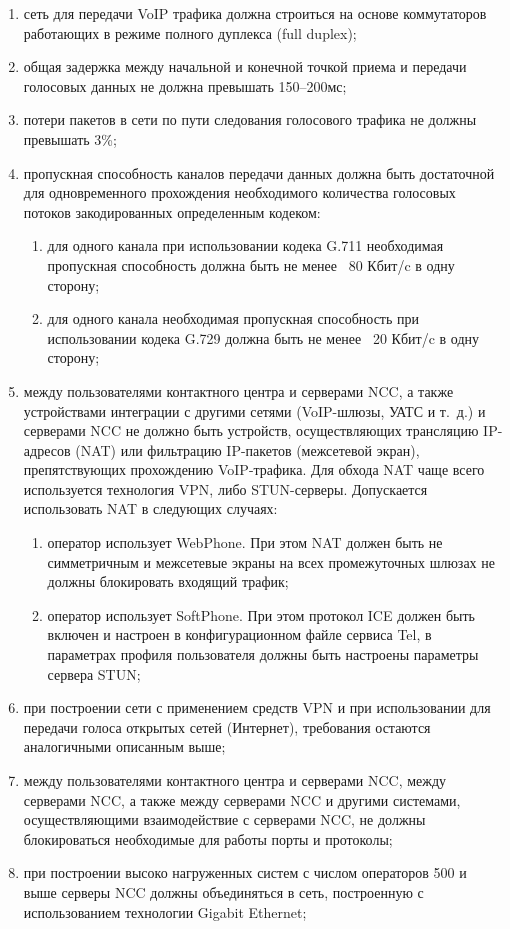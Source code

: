 \begin{enumerate}
    \item сеть для передачи VoIP трафика должна строиться на основе коммутаторов работающих в режиме полного дуплекса (full duplex);
    \item общая задержка между начальной и конечной точкой приема и передачи голосовых данных не должна превышать 150--200мс;
    \item потери пакетов в сети по пути следования голосового трафика не должны превышать 3\%;
    \item пропускная способность каналов передачи данных должна быть достаточной для одновременного прохождения необходимого количества голосовых потоков закодированных определенным кодеком:
    \begin{enumerate}
        \item для одного канала при использовании кодека G.711 необходимая пропускная способность должна быть не менее ~80 Кбит/c в одну сторону;
        \item для одного канала необходимая пропускная способность при использовании кодека G.729 должна быть не менее ~20 Кбит/c в одну сторону;
    \end{enumerate}
    \item между пользователями контактного центра и серверами NCC, а также устройствами интеграции с другими сетями (VoIP-шлюзы, УАТС и т.~д.) и серверами NCC не должно быть устройств, осуществляющих трансляцию IP-адресов (NAT) или фильтрацию IP-пакетов (межсетевой экран), препятствующих прохождению VoIP-трафика. Для обхода NAT чаще всего используется технология VPN, либо STUN-серверы. Допускается использовать NAT в следующих случаях:
    \begin{enumerate}
        \item оператор использует WebPhone. При этом NAT должен быть не симметричным и межсетевые экраны на всех промежуточных шлюзах не должны блокировать входящий трафик;
        \item оператор использует SoftPhone. При этом протокол ICE должен быть включен и настроен в конфигурационном файле сервиса Tel, в параметрах профиля пользователя должны быть настроены параметры сервера STUN;
    \end{enumerate}
    \item при построении сети с применением средств VPN и при использовании для передачи голоса открытых сетей (Интернет), требования остаются аналогичными описанным выше;
    \item между пользователями контактного центра и серверами NCC, между серверами NCC, а также между серверами NCC и другими системами, осуществляющими взаимодействие с серверами NCC, не должны блокироваться необходимые для работы порты и протоколы;
    \item при построении высоко нагруженных систем с числом операторов 500 и выше серверы NCC должны объединяться в сеть, построенную с использованием технологии Gigabit Ethernet;
\end{enumerate}

